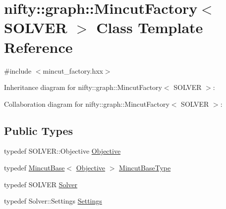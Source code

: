 \hypertarget{classnifty_1_1graph_1_1MincutFactory}{}\section{nifty\+:\+:graph\+:\+:Mincut\+Factory$<$ S\+O\+L\+V\+E\+R $>$ Class Template Reference}
\label{classnifty_1_1graph_1_1MincutFactory}


{\ttfamily \#include $<$mincut\+\_\+factory.\+hxx$>$}



Inheritance diagram for nifty\+:\+:graph\+:\+:Mincut\+Factory$<$ S\+O\+L\+V\+E\+R $>$\+:


Collaboration diagram for nifty\+:\+:graph\+:\+:Mincut\+Factory$<$ S\+O\+L\+V\+E\+R $>$\+:
\subsection*{Public Types}
\begin{DoxyCompactItemize}
\item 
typedef S\+O\+L\+V\+E\+R\+::\+Objective \hyperlink{classnifty_1_1graph_1_1MincutFactory_a6f92b21c6eee586b7b986488e3b381bc}{Objective}
\item 
typedef \hyperlink{classnifty_1_1graph_1_1MincutBase}{Mincut\+Base}$<$ \hyperlink{classnifty_1_1graph_1_1MincutFactory_a6f92b21c6eee586b7b986488e3b381bc}{Objective} $>$ \hyperlink{classnifty_1_1graph_1_1MincutFactory_a5a23fd8e8d5be1d6b80a8936d530e23a}{Mincut\+Base\+Type}
\item 
typedef S\+O\+L\+V\+E\+R \hyperlink{classnifty_1_1graph_1_1MincutFactory_a9d7f5efdd22f5de230a1b477234918d5}{Solver}
\item 
typedef Solver\+::\+Settings \hyperlink{classnifty_1_1graph_1_1MincutFactory_a2933cb2ed374c3ad593e2bfafa4a12fa}{Settings}
\end{DoxyCompactItemize}
